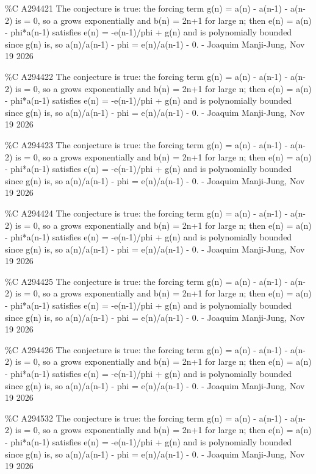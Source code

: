 {\%C A294421 The conjecture is true: the forcing term g(n) = a(n) - a(n-1) - a(n-2) is = 0, so a grows exponentially and b(n) = 2n+1 for large n; then e(n) = a(n) - phi*a(n-1) satisfies e(n) = -e(n-1)/phi + g(n) and is polynomially bounded since g(n) is, so a(n)/a(n-1) - phi = e(n)/a(n-1) - 0. - Joaquim Manji-Jung, Nov 19 2026\par
\%C A294422 The conjecture is true: the forcing term g(n) = a(n) - a(n-1) - a(n-2) is = 0, so a grows exponentially and b(n) = 2n+1 for large n; then e(n) = a(n) - phi*a(n-1) satisfies e(n) = -e(n-1)/phi + g(n) and is polynomially bounded since g(n) is, so a(n)/a(n-1) - phi = e(n)/a(n-1) - 0. - Joaquim Manji-Jung, Nov 19 2026\par
\%C A294423 The conjecture is true: the forcing term g(n) = a(n) - a(n-1) - a(n-2) is = 0, so a grows exponentially and b(n) = 2n+1 for large n; then e(n) = a(n) - phi*a(n-1) satisfies e(n) = -e(n-1)/phi + g(n) and is polynomially bounded since g(n) is, so a(n)/a(n-1) - phi = e(n)/a(n-1) - 0. - Joaquim Manji-Jung, Nov 19 2026\par
\%C A294424 The conjecture is true: the forcing term g(n) = a(n) - a(n-1) - a(n-2) is = 0, so a grows exponentially and b(n) = 2n+1 for large n; then e(n) = a(n) - phi*a(n-1) satisfies e(n) = -e(n-1)/phi + g(n) and is polynomially bounded since g(n) is, so a(n)/a(n-1) - phi = e(n)/a(n-1) - 0. - Joaquim Manji-Jung, Nov 19 2026\par
\%C A294425 The conjecture is true: the forcing term g(n) = a(n) - a(n-1) - a(n-2) is = 0, so a grows exponentially and b(n) = 2n+1 for large n; then e(n) = a(n) - phi*a(n-1) satisfies e(n) = -e(n-1)/phi + g(n) and is polynomially bounded since g(n) is, so a(n)/a(n-1) - phi = e(n)/a(n-1) - 0. - Joaquim Manji-Jung, Nov 19 2026\par
\%C A294426 The conjecture is true: the forcing term g(n) = a(n) - a(n-1) - a(n-2) is = 0, so a grows exponentially and b(n) = 2n+1 for large n; then e(n) = a(n) - phi*a(n-1) satisfies e(n) = -e(n-1)/phi + g(n) and is polynomially bounded since g(n) is, so a(n)/a(n-1) - phi = e(n)/a(n-1) - 0. - Joaquim Manji-Jung, Nov 19 2026\par
\%C A294532 The conjecture is true: the forcing term g(n) = a(n) - a(n-1) - a(n-2) is = 0, so a grows exponentially and b(n) = 2n+1 for large n; then e(n) = a(n) - phi*a(n-1) satisfies e(n) = -e(n-1)/phi + g(n) and is polynomially bounded since g(n) is, so a(n)/a(n-1) - phi = e(n)/a(n-1) - 0. - Joaquim Manji-Jung, Nov 19 2026\par
}
